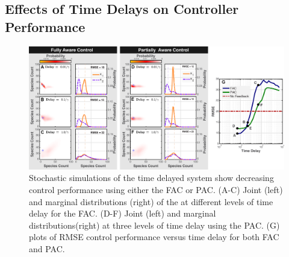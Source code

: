 \documentclass[12pt]{iopart}
\begin{document}


\subsection{Effects of Time Delays on Controller Performance}
\begin{figure}
\begin{center}
\includegraphics[width=1\textwidth]{TimeDelay.pdf}
\vspace{-0.1in}
\caption{Stochastic simulations of the time delayed system show decreasing control performance using either the FAC or PAC. (A-C) Joint (left) and marginal distributions (right) of the at different levels of time delay for the FAC. (D-F) Joint (left) and marginal distributions(right) at three levels of time delay using the PAC.  (G) plots of RMSE control performance versus time delay for both FAC and PAC.}
\label{Time}
\end{center}
\vspace{-0.2in}
\end{figure}
\end{document}
